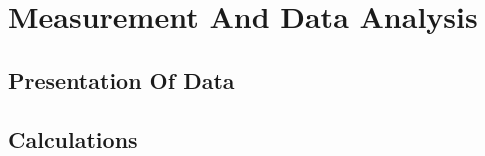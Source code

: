 \section{Measurement And Data Analysis}

	\subsection{Presentation Of Data}
	
	\subsection{Calculations}